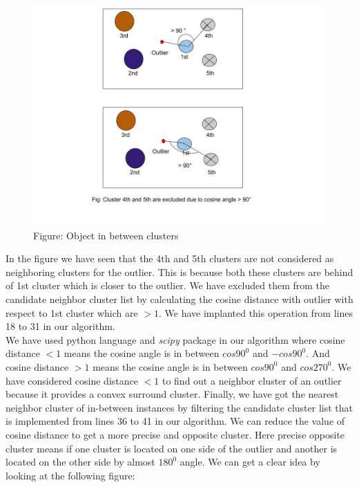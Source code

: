 \documentclass[11pt]{article}
\theoremstyle{definition}
\begin{document}
\begin{figure}[H]
\centering
\includegraphics[scale=.5]{images/Copy of Object-inbet-instance.jpg}\\
Figure: Object in between clusters
\end{figure}
\noindent In the figure we have seen that the 4th and 5th clusters are not considered as neighboring clusters for the outlier. This is because both these clusters are behind of 1st cluster which is closer to the outlier. We have excluded them from the candidate neighbor cluster list by calculating the cosine distance with outlier with respect to 1st cluster which are $>1$. We have implanted this operation from lines 18 to 31 in our algorithm.\\
We have used python language and \textit{scipy} package in our algorithm where cosine distance $<1$ means the cosine angle is in between $cos90^0 $ and $-cos90^0$. And cosine distance $>1$ means the cosine angle is in between $cos90^0 $ and $cos270^0$. We have considered cosine distance $<1$ to find out a neighbor cluster of an outlier because it provides a convex surround cluster. Finally, we have got the nearest neighbor cluster of in-between instances by filtering the candidate cluster list that is implemented from lines 36 to 41 in our algorithm. We can reduce the value of cosine distance to get a more precise and opposite cluster. Here precise opposite cluster means if one cluster is located on one side of the outlier and another is located on the other side by almost $180^0$ angle. We can get a clear idea by looking at the following figure:
\end{document}
